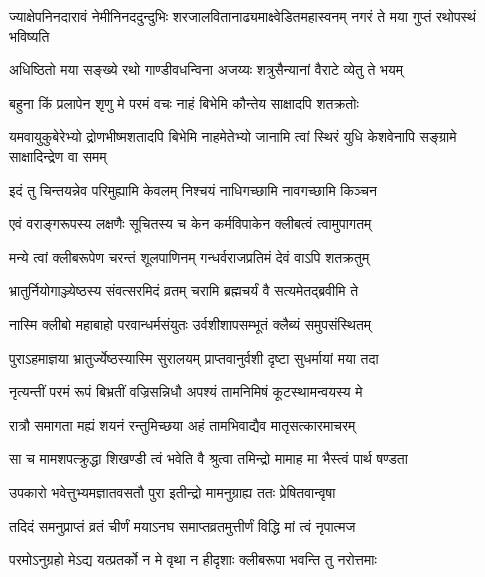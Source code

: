 \threelineshloka
{ज्याक्षेपनिनदारावं नेमीनिनददुन्दुभिः}
{शरजालवितानाढ्यमाक्ष्वेडितमहास्वनम्}
{नगरं ते मया गुप्तं रथोपस्थं भविष्यति}


\twolineshloka
{अधिष्ठितो मया सङ्ख्ये रथो गाण्डीवधन्विना}
{अजय्यः शत्रुसैन्यानां वैराटे व्येतु ते भयम्}




\twolineshloka
{बहुना किं प्रलापेन शृणु मे परमं वचः}
{नाहं बिभेमि कौन्तेय साक्षादपि शतक्रतोः}


\threelineshloka
{यमवायुकुबेरेभ्यो द्रोणभीष्मशतादपि}
{बिभेमि नाहमेतेभ्यो जानामि त्वां स्थिरं युधि}
{केशवेनापि सङ्ग्रामे साक्षादिन्द्रेण वा समम्}


\twolineshloka
{इदं तु चिन्तयन्नेव परिमुह्यामि केवलम्}
{निश्चयं नाधिगच्छामि नावगच्छामि किञ्चन}


\twolineshloka
{एवं वराङ्गरूपस्य लक्षणैः सूचितस्य च}
{केन कर्मविपाकेन क्लीबत्वं त्वामुपागतम्}


\twolineshloka
{मन्ये त्वां क्लीबरूपेण चरन्तं शूलपाणिनम्}
{गन्धर्वराजप्रतिमं देवं वाऽपि शतक्रतुम्}




\twolineshloka
{भ्रातुर्नियोगाञ्ज्येष्ठस्य संवत्सरमिदं व्रतम्}
{चरामि ब्रह्मचर्यं वै सत्यमेतद्ब्रवीमि ते}


\twolineshloka
{नास्मि क्लीबो महाबाहो परवान्धर्मसंयुतः}
{उर्वशीशापसम्भूतं क्लैब्यं समुपसंस्थितम्}


\twolineshloka
{पुराऽहमाज्ञया भ्रातुर्ज्येष्ठस्यास्मि सुरालयम्}
{प्राप्तवानुर्वशी दृष्टा सुधर्मायां मया तदा}


\twolineshloka
{नृत्यन्तीं परमं रूपं बिभ्रतीं वज्रिसन्निधौ}
{अपश्यं तामनिमिषं कूटस्थामन्वयस्य मे}


\twolineshloka
{रात्रौ समागता मह्यं शयनं रन्तुमिच्छया}
{अहं तामभिवाद्यैव मातृसत्कारमाचरम्}


\twolineshloka
{सा च मामशपत्क्रुद्धा शिखण्डी त्वं भवेति वै}
{श्रुत्वा तमिन्द्रो मामाह मा भैस्त्वं पार्थ षण्डता}


\twolineshloka
{उपकारो भवेत्तुभ्यमज्ञातवसतौ पुरा}
{इतीन्द्रो मामनुग्राह्य ततः प्रेषितवान्वृषा}


\twolineshloka
{तदिदं समनुप्राप्तं व्रतं चीर्णं मयाऽनघ}
{समाप्तव्रतमुत्तीर्णं विद्धि मां त्वं नृपात्मज}




\twolineshloka
{परमोऽनुग्रहो मेऽद्य यत्प्रतर्को न मे वृथा}
{न हीदृशाः क्लीबरूपा भवन्ति तु नरोत्तमाः}



